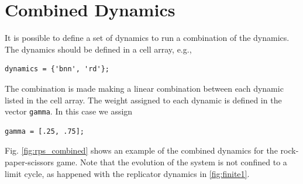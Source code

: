 \documentclass[a4paper,10pt]{article}
\begin{document}
\fi






\section{Combined Dynamics}

It is possible to define a set of dynamics to run a combination of the dynamics. The dynamics should be defined in a cell array, e.g., 
\begin{lstlisting}
dynamics = {'bnn', 'rd'};
\end{lstlisting}
The combination is made making a linear combination between each dynamic listed in the cell array. The weight assigned to each dynamic is defined in the vector \verb|gamma|. In this case we assign 
\begin{lstlisting}
gamma = [.25, .75]; 
\end{lstlisting}

Fig. \ref{fig:rps_combined} shows an example of the combined dynamics for the rock-paper-scissors game. Note that the evolution of the system is not confined to a limit cycle, as happened with the replicator dynamics in \ref{fig:finite1}.
\end{document}
